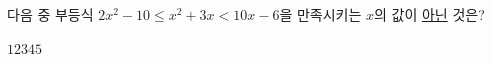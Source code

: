 다음 중 부등식 $2x^2-10\le x^2+3x<10x-6$을 만족시키는 $x$의 값이 \underline{아닌} 것은?
\begin{choices32}{$1$}{$2$}{$3$}{$4$}{$5$}\end{choices32}
